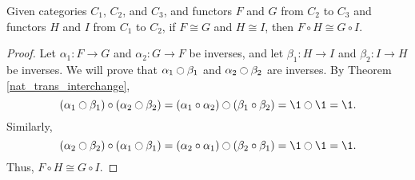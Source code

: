 \documentclass[../math.tex]{subfiles}
\begin{document}
\begin{theorem}
    Given categories $C_1$, $C_2$, and $C_3$, and functors $F$ and $G$ from
    $C_2$ to $C_3$ and functors $H$ and $I$ from $C_1$ to $C_2$, if $F \cong G$
    and $H \cong I$, then $F \circ H \cong G \circ I$.
\end{theorem}
\begin{proof}
    Let $\alpha_1 : F \to G$ and $\alpha_2 : G \to F$ be inverses, and let
    $\beta_1 : H \to I$ and $\beta_2 : I \to H$ be inverses.  We will prove that
    $\alpha_1 \ocircle \beta_1$ and $\alpha_2 \ocircle \beta_2$ are inverses.
    By Theorem \ref{nat_trans_interchange},
    \[
        (\alpha_1 \ocircle \beta_1) \circ (\alpha_2 \ocircle \beta_2)
        = (\alpha_1 \circ \alpha_2) \ocircle (\beta_1 \circ \beta_2)
        = \1 \ocircle \1 = \1.
    \]
    Similarly,
    \[
        (\alpha_2 \ocircle \beta_2) \circ (\alpha_1 \ocircle \beta_1)
        = (\alpha_2 \circ \alpha_1) \ocircle (\beta_2 \circ \beta_1)
        = \1 \ocircle \1 = \1.
    \]
    Thus, $F \circ H \cong G \circ I$.
\end{proof}
\end{document}
